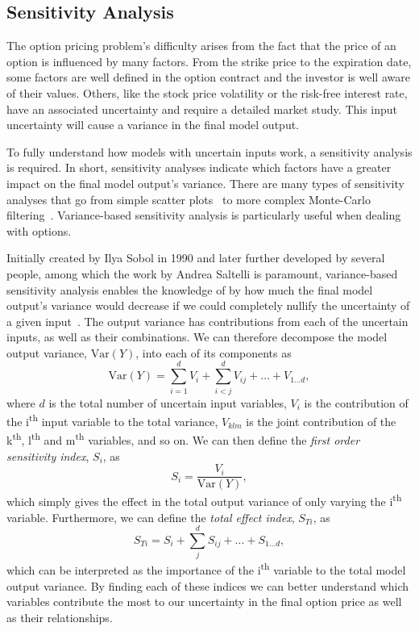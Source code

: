 \documentclass[a4paper,twocolumn,aps,prd,longbibliography,superscriptaddress]{revtex4-1}
\begin{document}
\subsection{Sensitivity Analysis}
The option pricing problem's difficulty arises from the fact that the price of an option is influenced by many factors.
From the strike price to the expiration date, some factors are well defined in the option contract and the investor is well aware of their values. Others, like the stock price volatility or the risk-free interest rate, have an associated uncertainty and require a detailed market study. This input uncertainty will cause a variance in the final model output.

To fully understand how models with uncertain inputs work, a sensitivity analysis is required. In short, sensitivity analyses indicate which factors have a greater impact on the final model output's variance.
There are many types of sensitivity analyses that go from simple scatter plots~\cite{Saltelli} to more complex Monte-Carlo filtering~\cite{Saltelli}. Variance-based sensitivity analysis is particularly useful when dealing with options.

Initially created by Ilya Sobol in 1990 and later further developed by several people, among which the work by Andrea Saltelli is paramount, variance-based sensitivity analysis enables the knowledge of by how much the final model output's variance would decrease if we could completely nullify the uncertainty of a given input~\cite{Saltelli}.
The output variance has contributions from each of the uncertain inputs, as well as their combinations. We can therefore decompose the model output variance, $\mathrm{Var}(Y)$, into each of its components as
\begin{equation}
\mathrm{Var}(Y)=\sum_{i=1}^dV_i+\sum_{i<j}^dV_{ij}+\dots+V_{1\dots d},
\end{equation}
\noindent where $d$ is the total number of uncertain input variables, $V_{i}$ is the contribution of the i\textsuperscript{th} input variable to the total variance, $V_{klm}$ is the joint contribution of the k\textsuperscript{th}, l\textsuperscript{th} and m\textsuperscript{th} variables, and so on.
We can then define the \textit{first order sensitivity index}, $S_i$, as
\begin{equation}\label{Si}
S_i=\frac{V_i}{\mathrm{Var}(Y)},
\end{equation}
\noindent which simply gives the effect in the total output variance of only varying the i\textsuperscript{th} variable.
Furthermore, we can define the \textit{total effect index}, $S_{Ti}$, as
\begin{equation}\label{STi}
S_{Ti}=S_i+\sum_{j}^dS_{ij}+\dots+S_{1\dots d},
\end{equation}
\noindent which can be interpreted as the importance of the i\textsuperscript{th} variable to the total model output variance.
By finding each of these indices we can better understand which variables contribute the most to our uncertainty in the final option price as well as their relationships.
\end{document}
